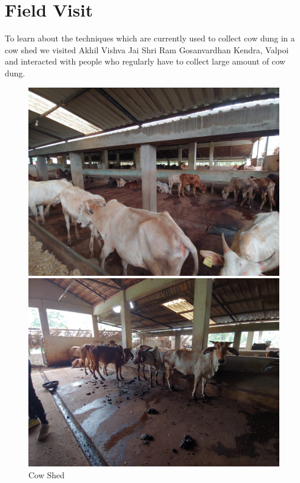 \section{Field Visit}
\noindent To learn about the techniques which are currently used to collect cow dung in a cow shed we visited Akhil Vishva Jai Shri Ram Gosanvardhan Kendra, Valpoi and interacted with people who regularly have to collect large amount of cow dung.

\begin{figure}[H]
  \centering
    \begin{minipage}{0.40\textwidth}
    \centering
      \includegraphics[width=1\textwidth]{Cow Shed.jpg}

    \end{minipage}
\hfill
    \begin{minipage}{0.40\textwidth}
    \centering
      \includegraphics[width=1\textwidth]{Cow Shed 2.jpg}

    \end{minipage}
\caption{Cow Shed}
\end{figure}



